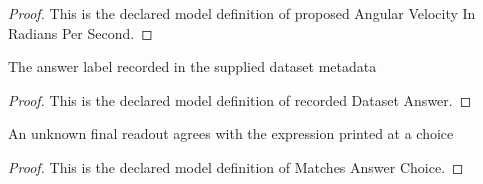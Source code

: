 \begin{proof}
  This is the declared model definition of proposed Angular Velocity In Radians Per Second.
\end{proof}
\begin{definition}
  \label{def:physics:phyx-mini-0826:phyxminiproblems-problemphyxmini0826-recordeddatasetanswer}
  The answer label recorded in the supplied dataset metadata
\end{definition}
\begin{proof}
  This is the declared model definition of recorded Dataset Answer.
\end{proof}
\begin{definition}
  \label{def:physics:phyx-mini-0826:phyxminiproblems-problemphyxmini0826-matchesanswerchoice}
  An unknown final readout agrees with the expression printed at a choice
\end{definition}
\begin{proof}
  This is the declared model definition of Matches Answer Choice.
\end{proof}
